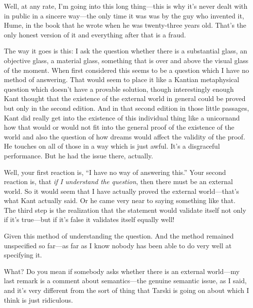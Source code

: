 Well, at any rate, I'm going into this long thing---this is why it's 
never dealt with in public in a sincere way---the only time it was was by 
the guy who invented it, Hume, in the book that he wrote when he was 
twenty-three years old. That's the only honest version of it and everything 
after that is a fraud. 

The way it goes is this: I ask the question whether there is a 
substantial glass, an objective glass, a material glass, something that is 
over and above the visual glass of the moment. When first considered 
this seems to be a question which I have no method of answering. That 
would seem to place it like a Kantian metaphysical question which 
doesn't have a provable solution, though interestingly enough Kant 
thought that the existence of the external world in general could be 
proved but only in the second edition. And in that second edition in 
those little passages, Kant did really get into the existence of this 
individual thing like a unicornand how that would or would not fit into 
the general proof of the existence of the world and also the question of 
how dreams would affect the validity of the proof. He touches on all of 
those in a way which is just awful. It's a disgraceful performance. But he 
had the issue there, actually. 

Well, your first reaction is, \enquote{I have no way of answering this.} Your 
second reaction is, that \emph{if I understand the question}, then there must be 
an external world. So it would seem that I have actually proved the 
external world---that's what Kant actually said. Or he came very near 
to saying something like that. The third step is the realization that the 
statement would validate itself not only if it's true---but if it's false it 
validates itself equally well! 

 Given this method of understanding the question. And the 
method remained unspecified so far---as far as I know nobody has been 
able to do very well at specifying it. 

 What? Do you mean if somebody asks whether there is an 
external world---my last remark is a comment about semantics---the 
genuine semantic issue, as I said, and it's very different from the sort of 
thing that Tarski is going on about which I think is just ridiculous. 

